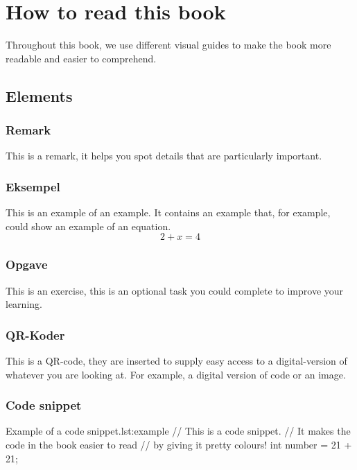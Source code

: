 \cleardoublepage
\chapter{How to read this book}
Throughout this book, we use different visual guides to make the book more readable and easier to comprehend.

\section{Elements}

\subsection{Remark}
\begin{remark}
	This is a remark, it helps you spot details that are particularly important.
\end{remark}

\subsection{Eksempel}
\begin{example}
	This is an example of an example. It contains an example that, for example, could show an example of an equation.
	$$2+x=4$$
\end{example}

\subsection{Opgave}
\begin{exercise}
	This is an exercise, this is an optional task you could complete to improve your learning.
\end{exercise}

\subsection{QR-Koder}
This is a QR-code, they are inserted to supply easy access to a digital-version of whatever you are looking at. For example, a digital version of code or an image.


\subsection{Code snippet}

\begin{JavaCodeH}{Example of a code snippet.}{lst:example}
	// This is a code snippet.
	// It makes the code in the book easier to read
	// by giving it pretty colours!
	int number = 21 + 21;
\end{JavaCodeH}